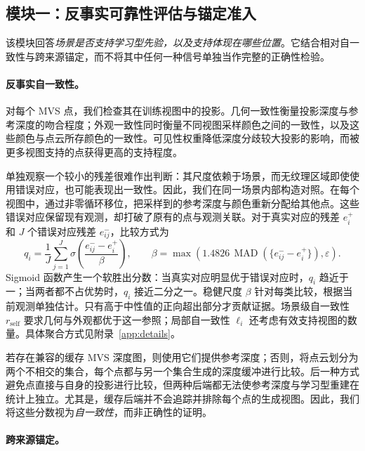 \documentclass{article}
\newcommand{\rself}{r_{\mathrm{self}}}
\DeclareMathOperator{\MAD}{MAD}
\begin{document}
\subsection{模块一：反事实可靠性评估与锚定准入}
\label{sec:admission}
\label{sec:calibration}

该模块回答\emph{场景是否支持学习型先验，以及支持体现在哪些位置}。它结合相对自一致性与跨来源锚定，而不将其中任何一种信号单独当作完整的正确性检验。

\paragraph{反事实自一致性。}
对每个 MVS 点，我们检查其在训练视图中的投影。几何一致性衡量投影深度与参考深度的吻合程度；外观一致性同时衡量不同视图采样颜色之间的一致性，以及这些颜色与点云所存颜色的一致性。可见性权重降低深度分歧较大投影的影响，而被更多视图支持的点获得更高的支持程度。

单独观察一个较小的残差很难作出判断：其尺度依赖于场景，而无纹理区域即使使用错误对应，也可能表现出一致性。因此，我们在同一场景内部构造对照。在每个视图中，通过非零循环移位，把采样到的参考深度与颜色重新分配给其他点。这些错误对应保留现有观测，却打破了原有的点与观测关联。对于真实对应的残差 $e_i^+$ 和 $J$ 个错误对应残差 $e_{ij}^-$，比较方式为
\begin{equation}
q_i=\frac{1}{J}\sum_{j=1}^{J}
\sigma\!\left(\frac{e_{ij}^- - e_i^+}{\beta}\right),
\qquad
\beta=\max\!\left(1.4826\,\MAD(\{e_{ij}^- - e_i^+\}),\varepsilon\right).
\label{eq:calibration}
\end{equation}
Sigmoid 函数产生一个软胜出分数：当真实对应明显优于错误对应时，$q_i$ 趋近于一；当两者都不占优势时，$q_i$ 接近二分之一。稳健尺度 $\beta$ 针对每类比较，根据当前观测单独估计。只有高于中性值的正向超出部分才贡献证据。场景级自一致性 $\rself$ 要求几何与外观都优于这一参照；局部自一致性 $\ell_i$ 还考虑有效支持视图的数量。具体聚合方式见附录~\ref{app:details}。

若存在兼容的缓存 MVS 深度图，则使用它们提供参考深度；否则，将点云划分为两个不相交的集合，每个点都与另一个集合生成的深度缓冲进行比较。后一种方式避免点直接与自身的投影进行比较，但两种后端都无法使参考深度与学习型重建在统计上独立。尤其是，缓存后端并不会追踪并排除每个点的生成视图。因此，我们将这些分数视为\emph{自一致性}，而非正确性的证明。

\paragraph{跨来源锚定。}
\label{sec:gate}
\end{document}
